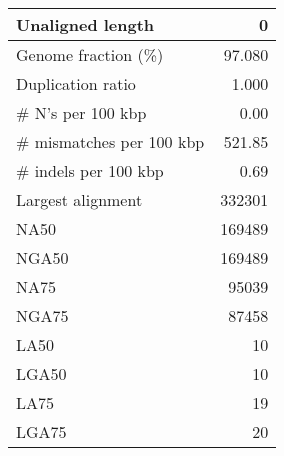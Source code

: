 \documentclass[12pt,a4paper]{article}
\begin{document}
\begin{table}[ht]
\begin{center}
\begin{tabular}{|l*{1}{|r}|}
Unaligned length & 0 \\ \hline
Genome fraction (\%) & 97.080 \\ \hline
Duplication ratio & 1.000 \\ \hline
\# N's per 100 kbp & 0.00 \\ \hline
\# mismatches per 100 kbp & 521.85 \\ \hline
\# indels per 100 kbp & 0.69 \\ \hline
Largest alignment & 332301 \\ \hline
NA50 & 169489 \\ \hline
NGA50 & 169489 \\ \hline
NA75 & 95039 \\ \hline
NGA75 & 87458 \\ \hline
LA50 & 10 \\ \hline
LGA50 & 10 \\ \hline
LA75 & 19 \\ \hline
LGA75 & 20 \\ \hline
\end{tabular}
\end{center}
\end{table}
\end{document}
